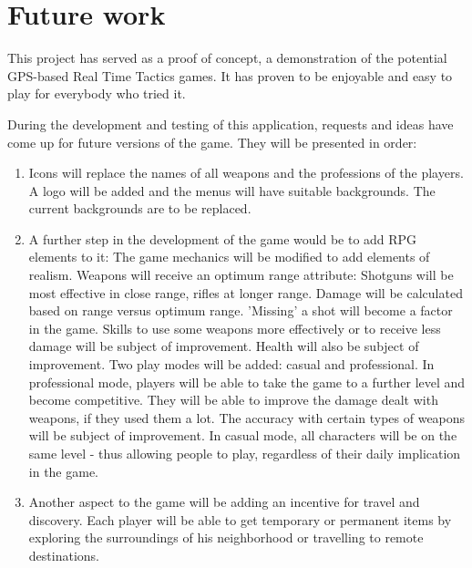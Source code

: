 
\section{Future work}


This project has served as a proof of concept, a demonstration of the
potential GPS-based Real Time Tactics games. It has proven to be enjoyable
and easy to play for everybody who tried it.\newline

During the development and testing of this application, requests and ideas have
come up for future versions of the game. They will be presented in
order:\newline
\begin{enumerate}
  \item Icons will replace the names of all weapons and the professions of the
  players. A logo will be added and the menus will have suitable backgrounds.
  The current backgrounds are to be replaced.
  
  \item A further step in the development of the game would be to add RPG
  elements to it: The game mechanics will be modified to add elements of
  realism. Weapons will receive an optimum range attribute: Shotguns will be
  most effective in close range, rifles at longer range. Damage will be
  calculated based on range versus optimum range. 'Missing' a shot will become a
  factor in the game. Skills to use some weapons more effectively or to receive
  less damage will be subject of improvement. Health will also be subject of
  improvement. Two play modes will be added: casual and professional. In
  professional mode, players will be able to take the game to a further level
  and become competitive. They will be able to improve the damage dealt with
  weapons, if they used them a lot. The accuracy with certain types of weapons
  will be subject of improvement. In casual mode, all characters will be on the
  same level - thus allowing people to play, regardless of their daily
  implication in the game.
  
  \item Another aspect to the game will be adding an incentive for travel and
  discovery. Each player will be able to get temporary or permanent items by
  exploring the surroundings of his neighborhood or travelling to remote
  destinations.   
  

\end{enumerate}
